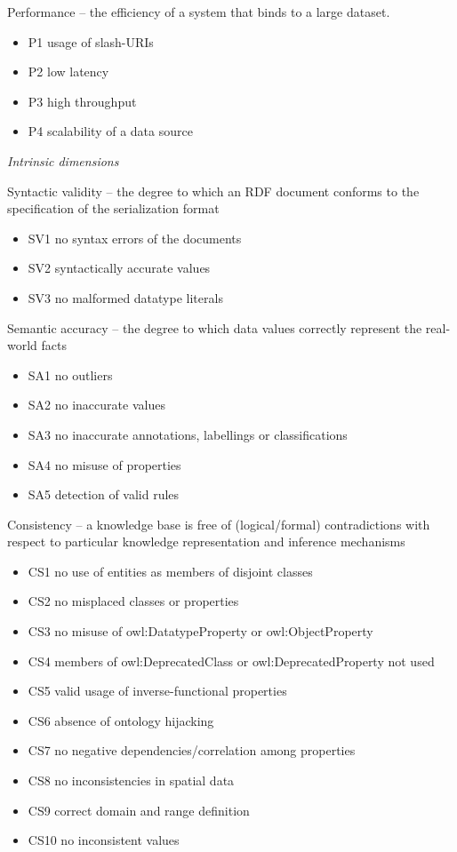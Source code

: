 Performance -- the efficiency of a system that binds to a large dataset.
\begin{itemize}
 \setlength{\parskip}{0pt}
 \setlength{\itemsep}{0pt plus 1pt}
 \item P1 usage of slash-URIs
 \item P2 low latency
 \item P3 high throughput
 \item P4 scalability of a data source
\end{itemize}

\emph{Intrinsic dimensions}

Syntactic validity -- the degree to which an RDF document conforms to the specification of the serialization format
\begin{itemize}
 \setlength{\parskip}{0pt}
 \setlength{\itemsep}{0pt plus 1pt}
 \item SV1 no syntax errors of the documents
 \item SV2 syntactically accurate values
 \item SV3 no malformed datatype literals
\end{itemize}

Semantic accuracy -- the degree to which data values correctly represent the real-world facts
\begin{itemize}
 \setlength{\parskip}{0pt}
 \setlength{\itemsep}{0pt plus 1pt}
 \item SA1 no outliers
 \item SA2 no inaccurate values
 \item SA3 no inaccurate annotations, labellings or classifications
 \item SA4 no misuse of properties
 \item SA5 detection of valid rules
\end{itemize}

Consistency -- a knowledge base is free of (logical/formal) contradictions with respect to particular knowledge representation and inference mechanisms
\begin{itemize}
 \setlength{\parskip}{0pt}
 \setlength{\itemsep}{0pt plus 1pt}
 \item CS1 no use of entities as members of disjoint classes
 \item CS2 no misplaced classes or properties
 \item CS3 no misuse of owl:DatatypeProperty or owl:ObjectProperty
 \item CS4 members of owl:DeprecatedClass or owl:DeprecatedProperty not used
 \item CS5 valid usage of inverse-functional properties
 \item CS6 absence of ontology hijacking
 \item CS7 no negative dependencies/correlation among properties
 \item CS8 no inconsistencies in spatial data
 \item CS9 correct domain and range definition
 \item CS10 no inconsistent values
\end{itemize}

